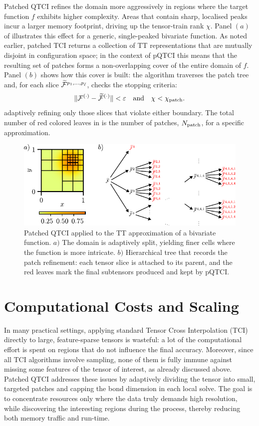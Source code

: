 Patched QTCI refines the domain more aggressively in regions where the target function $f$ exhibits higher complexity. Areas that contain sharp, localised peaks incur a larger memory footprint, driving up the tensor-train rank $\chi$. Panel $(a)$ of  illustrates this effect for a generic, single-peaked bivariate function. As noted earlier, patched TCI returns a collection of TT representations that are mutually disjoint in configuration space; in the context of pQTCI this means that the resulting set of patches forms a non-overlapping cover of the entire domain of $f$. Panel $(b)$ shows how this cover is built: the algorithm traverses the patch tree and, for each slice $\widetilde{\mathcal{F}}^{p_1,\dots,p_{\bar\ell}}$, checks the stopping criteria: 
\begin{equation}
	\| \mathcal{F}^{(\cdot)} - \widetilde{\mathcal{F}}^{(\cdot)} \| < \varepsilon \quad \text{and} \quad \chi < \chi_{\text{patch}}.
	\label{eq:patchConvergence}
\end{equation}
adaptively refining only those slices that violate either boundary. The total number of red colored leaves in  is the number of patches, $N_{\text{patch}}$, for a specific approximation.
\begin{figure}[ht!]
	\includegraphics{figures/PatchingTree.pdf}
	\caption{Patched QTCI applied to the TT approximation of a bivariate function. $a)$ The domain is adaptively split, yielding finer cells where the function is more intricate. $b)$ Hierarchical tree that records the patch refinement: each tensor slice is attached to its parent, and the red leaves mark the final subtensors produced and kept by pQTCI. }
	\label{fig:patchTree}
\end{figure}

\section{Computational Costs and Scaling}
\label{sec:patchingCost}


In many practical settings, applying standard Tensor Cross Interpolation (TCI) directly to large, feature-sparse tensors is wasteful: a lot of the computational effort is spent on regions that do not influence the final accuracy. Moreover,
since all TCI algorithms involve sampling, none of them is fully immune against missing some features of the tensor of interest, as already discussed above. Patched QTCI addresses these issues by adaptively dividing the tensor into small, targeted patches and capping the bond dimension in each local solve. The goal is to concentrate resources only where the data truly demands high resolution, while discovering the interesting regions during the process, thereby reducing both memory traffic and run-time.

